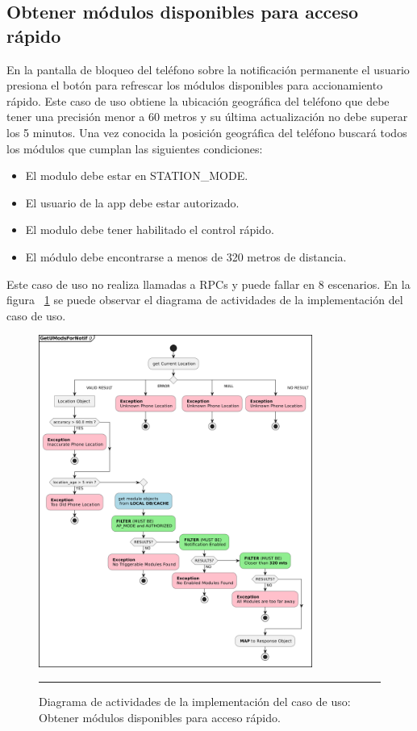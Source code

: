 \subsection{Obtener módulos disponibles para acceso rápido}
En la pantalla de bloqueo del teléfono sobre la notificación permanente el usuario presiona
el botón para refrescar los módulos disponibles para accionamiento rápido.
Este caso de uso obtiene la ubicación geográfica del teléfono que debe tener una precisión menor a 60 metros
y su última actualización no debe superar los 5 minutos.
Una vez conocida la posición geográfica del teléfono buscará todos los módulos que cumplan las siguientes condiciones:
\begin{itemize}
	\item El modulo debe estar en STATION\_MODE.
	\item El usuario de la app debe estar autorizado.
	\item El modulo debe tener habilitado el control rápido.
	\item El módulo debe encontrarse a menos de 320 metros de distancia.
\end{itemize}
Este caso de uso no realiza llamadas a RPCs y puede fallar en 8 escenarios.
En la figura ~\ref{fig:act_notif_modules} se puede observar el diagrama de actividades de la implementación del caso de uso.

\begin{figure}[htbp]
	\centering
	\includegraphics[width=0.8\textwidth]{Figures/iter3/ACT_getModsNotif.png}
	\rule{35em}{1pt}
	\caption[Class Diagram]{Diagrama de actividades de la implementación del caso de uso: Obtener módulos disponibles para acceso rápido.}
	\label{fig:act_notif_modules}
\end{figure}

